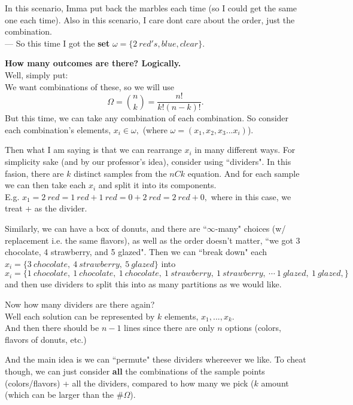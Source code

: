 \documentclass[12pt]{book}
\begin{document}
In this scenario, Imma put back the marbles each time (so I could get the same one each time). Also in this scenario, I care dont care about the order, just the combination.\\
--- So this time I got the \textbf{set} $\omega =\big\{2~red's, blue, clear\big\}$.

\noindent \textbf{How many outcomes are there? Logically.} \\
Well, simply put:\\
We want combinations of these, so we will use 
$$\Omega = {n \choose k} = \frac{n!}{k!(n-k)!}.$$
But this time, we can take any combination of each combination. So consider each combination's elements, $x_i \in \omega,$ (where $\omega= (x_1,x_2,x_3...x_i)$). 

Then what I am saying is that we can rearrange $x_i$ in many different ways. For simplicity sake (and by our professor's idea), consider using ``dividers". In this fasion, there are $k$ distinct samples from the $nCk$ equation. And for each sample we can then take each $x_i$ and split it into its components. \\
E.g. $x_1 = 2~red = 1~red+1~red = 0+2~red = 2~red+0,$ where in this case, we treat + as the divider.

Similarly, we can have a box of donuts, and there are ``$\infty$-many" choices (w/ replacement i.e. the same flavors), as well as the order doesn't matter, ``we got 3 chocolate, 4 strawberry, and 5 glazed". Then we can ``break down" each \\
$x_i = \{ 3~chocolate,~4~strawberry,~5~glazed \}$ into  \\
$x_i = \{ 1~chocolate,~ 1~chocolate,~ 1~chocolate,~1~strawberry,~ 1~strawberry,~\cdots ~1~glazed,~1~glazed,\}$\\
and then use dividers to split this into as many partitions as we would like.

Now how many dividers are there again?\\
Well each solution can be represented by $k$ elements, $x_1,...,x_k$.\\
And then there should be $n-1$ lines since there are only $n$ options (colors, flavors of donuts, etc.)

And the main idea is we can ``permute" these dividers whereever we like. To cheat though, we can just consider \textbf{all} the combinations of the sample points (colors/flavors) + all the dividers, compared to how many we pick ($k$ amount (which can be larger than the $\#\Omega$).
\end{document}
